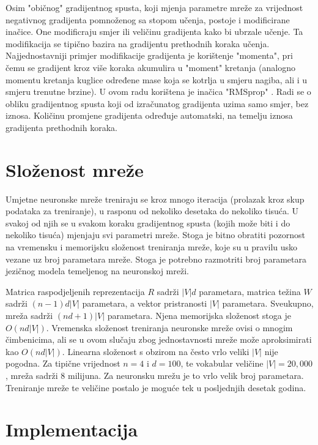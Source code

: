 \documentclass[times, utf8, diplomski, numeric]{fer}
\begin{document}
Osim "običnog" gradijentnog spusta, koji mjenja parametre mreže za vrijednost negativnog gradijenta pomnoženog sa stopom učenja, postoje i modificirane inačice. One modificraju smjer ili veličinu gradijenta kako bi ubrzale učenje. Ta modifikacija se tipično bazira na gradijentu prethodnih koraka učenja. Najjednostavniji primjer modifikacije gradijenta je korištenje "momenta", pri čemu se gradijent kroz više koraka akumulira u "moment" kretanja (analogno momentu kretanja kuglice određene mase koja se kotrlja u smjeru nagiba, ali i u smjeru trenutne brzine). U ovom radu korištena je inačica "RMSprop"  \cite{Tieleman2012}. Radi se o obliku gradijentnog spusta koji od izračunatog gradijenta uzima samo smjer, bez iznosa. Količinu promjene gradijenta određuje automatski, na temelju iznosa gradijenta prethodnih koraka.

\section{Složenost mreže}

Umjetne neuronske mreže treniraju se kroz mnogo iteracija (prolazak kroz skup podataka za treniranje), u rasponu od nekoliko desetaka do nekoliko tisuća. U svakoj od njih se u svakom koraku gradijentnog spusta (kojih može biti i do nekoliko tisuća) mjenjaju svi parametri mreže. Stoga je bitno obratiti pozornost na vremensku i memorijsku složenost treniranja mreže, koje su u pravilu usko vezane uz broj parametara mreže. Stoga je potrebno razmotriti broj parametara jezičnog modela temeljenog na neuronskoj mreži.

Matrica raspodjeljenih reprezentacija $R$ sadrži $|V| d$ parametara, matrica težina $W$ sadrži $(n - 1) d |V|$ parametara, a vektor pristranosti $|V|$ parametara. Sveukupno, mreža sadrži $(n d + 1) |V|$ parametara. Njena memorijska složenost stoga je $O(n d |V|)$. Vremenska složenost treniranja neuronske mreže ovisi o mnogim čimbenicima, ali se u ovom slučaju zbog jednostavnosti mreže može aproksimirati kao $O(n d |V|)$. Linearna složenost s obzirom na često vrlo veliki $|V|$ nije pogodna. Za tipične vrijednost $n = 4$ i $d = 100$, te vokabular veličine $|V| = 20,000$, mreža sadrži 8 milijuna. Za neuronsku mrežu je to vrlo velik broj parametara. Treniranje mreže te veličine postalo je moguće tek u posljednjih desetak godina. 

\section{Implementacija}
\end{document}
